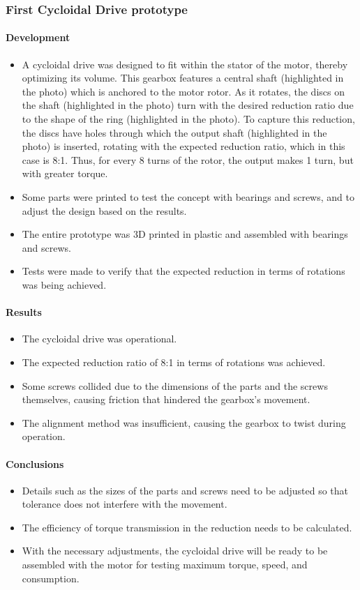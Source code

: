 \documentclass{article}
\begin{document}
\subsubsection{First Cycloidal Drive prototype}
\paragraph[short]{Development}
\begin{itemize}
    \item A cycloidal drive was designed to fit within the stator of the motor, thereby optimizing its volume. This gearbox features a central shaft (highlighted in the photo) which is anchored to the motor rotor. As it rotates, the discs on the shaft (highlighted in the photo) turn with the desired reduction ratio due to the shape of the ring (highlighted in the photo). To capture this reduction, the discs have holes through which the output shaft (highlighted in the photo) is inserted, rotating with the expected reduction ratio, which in this case is 8:1. Thus, for every 8 turns of the rotor, the output makes 1 turn, but with greater torque.
    \item Some parts were printed to test the concept with bearings and screws, and to adjust the design based on the results.
    \item The entire prototype was 3D printed in plastic and assembled with bearings and screws.
    \item Tests were made to verify that the expected reduction in terms of rotations was being achieved.
\end{itemize}
\paragraph[short]{Results}
\begin{itemize}
    \item The cycloidal drive was operational.
    \item The expected reduction ratio of 8:1 in terms of rotations was achieved.
    \item Some screws collided due to the dimensions of the parts and the screws themselves, causing friction that hindered the gearbox's movement.
    \item The alignment method was insufficient, causing the gearbox to twist during operation.
\end{itemize}

\paragraph[short]{Conclusions}
\begin{itemize}
    \item Details such as the sizes of the parts and screws need to be adjusted so that tolerance does not interfere with the movement.
    \item The efficiency of torque transmission in the reduction needs to be calculated.
    \item With the necessary adjustments, the cycloidal drive will be ready to be assembled with the motor for testing maximum torque, speed, and consumption.
\end{itemize}
\end{document}
